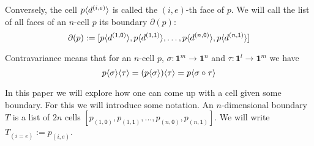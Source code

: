 \documentclass{llncs}
\newcommand{\mdef}{:=}
\newcommand{\mlist}[1]{[ {#1} ]}
\newcommand{\pint}[1]{\mathbf{1}^{#1}}
\newcommand{\pintrestr}[3]{\mathbf{1}^{#1}_{{#2}={#3}}}
\newcommand{\izero}{\mathsf{0}}
\newcommand{\ione}{\mathsf{1}}
\newcommand{\restrict}[2]{{#1}|_{#2}}
\newcommand{\smap}[1]{s^{{#1}}}
\newcommand{\dmap}[2]{d^{({#1} , {#2})}}
\newcommand{\cont}[2]{\ensuremath{ \ifthenelse{\equal{#2}{}}{#1}{{#1}\langle{#2}\rangle}} }
\newcommand{\boundary}[1]{\partial({#1})}
\newcommand{\comp}[2]{\mathsf{Comp}({#1}\ {#2})}
\begin{document}
Conversely, the cell $\cont{p}{\dmap{i}{e}}$ is called the $(i,e)$-th face of $p$. We
will call the list of all faces of an $n$-cell $p$ its boundary $\boundary{p}$:
$$\boundary{p} \mdef \mlist{ \cont{p}{\dmap{1}{\izero}},
  \cont{p}{\dmap{1}{\ione}} , \ldots , \cont{p}{\dmap{n}{\izero}}, \cont{p}{\dmap{n}{\ione}} }$$




Contravariance means that for an $n$-cell $p$, $\sigma : \pint{m} \to \pint{n}$ and $\tau : \pint{l} \to \pint{m}$ we have
$$\cont{\cont{p}{\sigma}}{\tau} = \cont{(\cont{p}{\sigma})}{\tau} = \cont{p}{\sigma \circ \tau}$$



In this paper we will explore how one can come up with a cell given some
boundary. For this we will introduce some notation. An
$n$-dimensional boundary $T$ is a list of $2n$ cells $\mlist{p_{(1,\izero)},
  p_{(1,\ione)} , ... , p_{(n,\izero)}, p_{(n, \ione)}}$. We will write
$T_{(i=e)} \mdef p_{(i,e)}$. %






\end{document}
